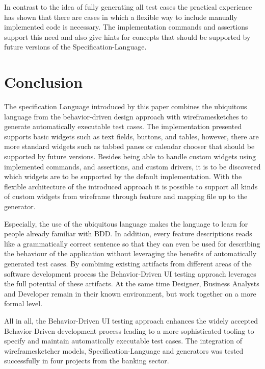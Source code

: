 \documentclass{sig-alternate-05-2015}
\begin{document}
In contrast to the idea of fully generating all test cases the practical experience has shown that there are cases in which a flexible way to include manually implemented code is necessary. 
The implementation commands and assertions support this need and also give hints for concepts that should be supported by future versions of the Specification-Language.


\section{Conclusion}\label{sec:Conclusion} %
The specification Language introduced by this paper combines the ubiquitous language from the behavior-driven design approach with wireframesketches to generate automatically executable test cases.
The implementation presented supports basic widgets such as text fields, buttons, and tables, however, there are more standard widgets such as tabbed panes or calendar chooser that should be supported by future versions.
Besides being able to handle custom widgets using implemented commands, and assertions, and custom drivers, it is to be discovered which widgets are to be supported by the default implementation.
With the flexible architecture of the introduced approach it is possible to support all kinds of custom widgets from wireframe through feature and mapping file up to the generator.

Especially, the use of the ubiquitous language makes the language to learn for people already familiar with BDD. 
In addition, every feature descriptions reads like a grammatically correct sentence so that they can even be used for describing the behaviour of the application without leveraging the benefits of automatically generated test cases.
By combining existing artifacts from different areas of the software development process the Behavior-Driven UI testing approach leverages the full potential of these artifacts.
At the same time Designer, Business Analysts and Developer remain in their known environment, but work together on a more formal level. 

All in all, the Behavior-Driven UI testing approach enhances the widely accepted Behavior-Driven development process leading to a more sophisticated tooling to specify and maintain automatically executable test cases.
The integration of wireframesketcher models, Specification-Language and generators was tested successfully in four projects from the banking sector. 
\end{document}
